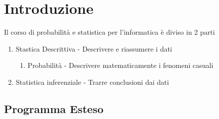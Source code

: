 \chapter*{Introduzione}
Il corso di probabilità e statistica per l'informatica è diviso in 2 parti
\begin{enumerate}
    \item Stastica Descrittiva - Descrivere e riassumere i dati
    \begin{enumerate}
        \item Probabilità - Descrivere matematicamente i fenomeni casuali
    \end{enumerate}
    \item Statistica inferenziale - Trarre conclusioni dai dati
\end{enumerate}

\section*{Programma Esteso}

